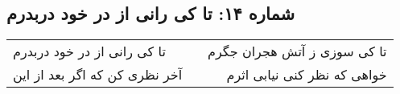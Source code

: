 \begin{center}
\section*{شماره ۱۴: تا کی رانی از در خود دربدرم}
\label{sec:014}
\begin{longtable}{l p{0.5cm} r}
تا کی رانی از در خود دربدرم
&&
تا کی سوزی ز آتش هجران جگرم
\\
آخر نظری کن که اگر بعد از این
&&
خواهی که نظر کنی نیابی اثرم
\\
\end{longtable}
\end{center}
